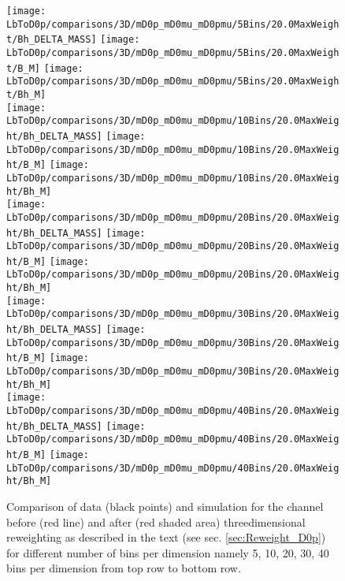 \begin{figure}[hptb]
	\centering
	\texttt{[image: LbToD0p/comparisons/3D/mD0p\_mD0mu\_mD0pmu/5Bins/20.0MaxWeight/Bh\_DELTA\_MASS]}
	\texttt{[image: LbToD0p/comparisons/3D/mD0p\_mD0mu\_mD0pmu/5Bins/20.0MaxWeight/B\_M]}
	\texttt{[image: LbToD0p/comparisons/3D/mD0p\_mD0mu\_mD0pmu/5Bins/20.0MaxWeight/Bh\_M]} \\
	\texttt{[image: LbToD0p/comparisons/3D/mD0p\_mD0mu\_mD0pmu/10Bins/20.0MaxWeight/Bh\_DELTA\_MASS]}
	\texttt{[image: LbToD0p/comparisons/3D/mD0p\_mD0mu\_mD0pmu/10Bins/20.0MaxWeight/B\_M]}
	\texttt{[image: LbToD0p/comparisons/3D/mD0p\_mD0mu\_mD0pmu/10Bins/20.0MaxWeight/Bh\_M]} \\
	\texttt{[image: LbToD0p/comparisons/3D/mD0p\_mD0mu\_mD0pmu/20Bins/20.0MaxWeight/Bh\_DELTA\_MASS]}
	\texttt{[image: LbToD0p/comparisons/3D/mD0p\_mD0mu\_mD0pmu/20Bins/20.0MaxWeight/B\_M]}
	\texttt{[image: LbToD0p/comparisons/3D/mD0p\_mD0mu\_mD0pmu/20Bins/20.0MaxWeight/Bh\_M]} \\
	\texttt{[image: LbToD0p/comparisons/3D/mD0p\_mD0mu\_mD0pmu/30Bins/20.0MaxWeight/Bh\_DELTA\_MASS]}
	\texttt{[image: LbToD0p/comparisons/3D/mD0p\_mD0mu\_mD0pmu/30Bins/20.0MaxWeight/B\_M]}
	\texttt{[image: LbToD0p/comparisons/3D/mD0p\_mD0mu\_mD0pmu/30Bins/20.0MaxWeight/Bh\_M]} \\
	\texttt{[image: LbToD0p/comparisons/3D/mD0p\_mD0mu\_mD0pmu/40Bins/20.0MaxWeight/Bh\_DELTA\_MASS]}
	\texttt{[image: LbToD0p/comparisons/3D/mD0p\_mD0mu\_mD0pmu/40Bins/20.0MaxWeight/B\_M]}
	\texttt{[image: LbToD0p/comparisons/3D/mD0p\_mD0mu\_mD0pmu/40Bins/20.0MaxWeight/Bh\_M]} 
	\caption{Comparison of data (black points) and simulation for the \LbToDpmunuX channel before (red line) and after (red shaded area) threedimensional reweighting as described in the text (see sec. \ref{sec:Reweight_D0p}) for different number of bins per dimension namely 5, 10, 20, 30, 40 bins per dimension from top row to bottom row.}
	\label{fig:reweighting_nbins}
\end{figure}

